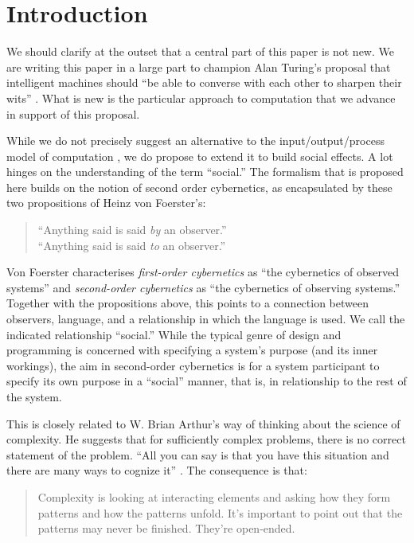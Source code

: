 \section{Introduction}
\label{sec:intro}

We should clarify at the outset that a central part of this paper is
not new.  We are writing this paper in a large part to champion Alan
Turing's proposal that intelligent machines should ``be able to
converse with each other to sharpen their wits''
\cite{turing-intelligent}.  What is new is the particular approach to
computation that we advance in support of this proposal.

While we do not precisely suggest an alternative to the
input/output/process model of computation \cite{marr1981vision}, we do
propose to extend it to build social effects.  A lot hinges on the
understanding of the term ``social.''  The formalism that is proposed
here builds on the notion of second order cybernetics, as encapsulated
by these two propositions of Heinz von Foerster's:

\begin{quote}
``Anything said is said \emph{by} an observer.'' \\
``Anything said is said \emph{to} an observer.''\\
\end{quote}

Von Foerster characterises \emph{first-order cybernetics} as ``the
cybernetics of observed systems'' and \emph{second-order cybernetics}
as ``the cybernetics of observing systems.''  Together with the
propositions above, this points to a connection between observers,
language, and a relationship in which the language is used.  We call
the indicated relationship ``social.''  While the typical genre of
design and programming is concerned with specifying a system's purpose
(and its inner workings), the aim in second-order cybernetics is for a
system participant to specify its own purpose in a ``social'' manner,
that is, in relationship to the rest of the system.

This is closely related to W. Brian Arthur's way of thinking about the
science of complexity.  He suggests that for sufficiently complex
problems, there is no correct statement of the problem.  ``All you can
say is that you have this situation and there are many ways to cognize
it'' \citep{brian-arthur-interview}.  The consequence is that:

\begin{quote}
Complexity is looking at interacting elements and asking how they form
patterns and how the patterns unfold.  It’s important to point out
that the patterns may never be finished.  They're open-ended.
\end{quote}

